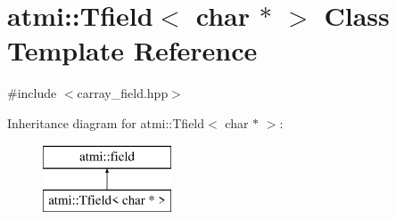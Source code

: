 \hypertarget{classatmi_1_1_tfield_3_01char_01_5_01_4}{\section{atmi\+:\+:Tfield$<$ char $\ast$ $>$ Class Template Reference}
\label{classatmi_1_1_tfield_3_01char_01_5_01_4}
}


 




{\ttfamily \#include $<$carray\+\_\+field.\+hpp$>$}

Inheritance diagram for atmi\+:\+:Tfield$<$ char $\ast$ $>$\+:\begin{figure}[H]
\begin{center}
\leavevmode
\includegraphics[height=2.000000cm]{classatmi_1_1_tfield_3_01char_01_5_01_4}
\end{center}
\end{figure}
